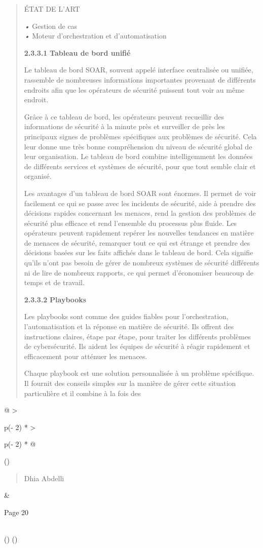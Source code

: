 \documentclass[
]{article}
\begin{document}
\begin{quote}
ÉTAT DE L'ART

\emph{•} Gestion de cas\\
\emph{•} Moteur d'orchestration et d'automatisation

\textbf{2.3.3.1} \textbf{Tableau de bord unifié}

Le tableau de bord SOAR, souvent appelé interface centralisée ou
unifiée, rassemble de nombreuses informations importantes provenant de
différents endroits afin que les opérateurs de sécurité puissent tout
voir au même endroit.

Grâce à ce tableau de bord, les opérateurs peuvent recueillir des
informations de sécurité à la minute près et surveiller de près les
principaux signes de problèmes spécifiques aux problèmes de sécurité.
Cela leur donne une très bonne compréhension du niveau de sécurité
global de leur organisation. Le tableau de bord combine intelligemment
les données de différents services et systèmes de sécurité, pour que
tout semble clair et organisé.

Les avantages d'un tableau de bord SOAR sont énormes. Il permet de voir
facilement ce qui se passe avec les incidents de sécurité, aide à
prendre des décisions rapides concernant les menaces, rend la gestion
des problèmes de sécurité plus efficace et rend l'ensemble du processus
plus fluide. Les opérateurs peuvent rapidement repérer les nouvelles
tendances en matière de menaces de sécurité, remarquer tout ce qui est
étrange et prendre des décisions basées sur les faits affichés dans le
tableau de bord. Cela signifie qu'ils n'ont pas besoin de gérer de
nombreux systèmes de sécurité différents ni de lire de nombreux
rapports, ce qui permet d'économiser beaucoup de temps et de travail.

\textbf{2.3.3.2} \textbf{Playbooks}

Les playbooks sont comme des guides fiables pour l'orchestration,
l'automatisation et la réponse en matière de sécurité. Ils offrent des
instructions claires, étape par étape, pour traiter les différents
problèmes de cybersécurité. Ils aident les équipes de sécurité à réagir
rapidement et efficacement pour atténuer les menaces.

Chaque playbook est une solution personnalisée à un problème spécifique.
Il fournit des conseils simples sur la manière de gérer cette situation
particulière et il combine à la fois des
\end{quote}

\begin{longtable}[]{@{}
  >{\raggedright\arraybackslash}p{(\columnwidth - 2\tabcolsep) * }
  >{\raggedright\arraybackslash}p{(\columnwidth - 2\tabcolsep) * }@{}}
\toprule()
\begin{minipage}[b]{\linewidth}\raggedright
\begin{quote}
Dhia Abdelli
\end{quote}
\end{minipage} & \begin{minipage}[b]{\linewidth}\raggedright
Page 20
\end{minipage} \\
\midrule()
\endhead
\bottomrule()
\end{longtable}
\end{document}
